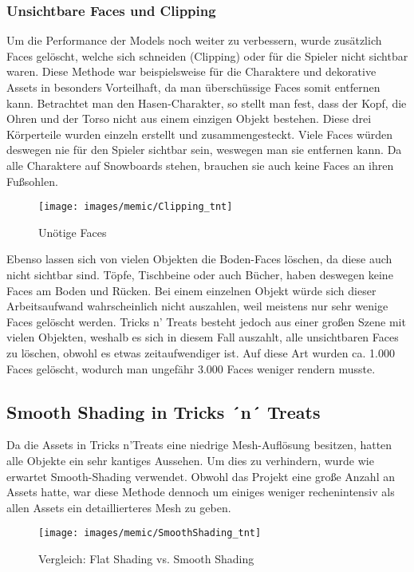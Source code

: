 \subsubsection{Unsichtbare Faces und Clipping}

Um die Performance der Models noch weiter zu verbessern, wurde zusätzlich Faces gelöscht, welche sich schneiden (Clipping) oder für die Spieler nicht sichtbar waren. Diese Methode war beispielsweise für die Charaktere und dekorative Assets in besonders Vorteilhaft, da man überschüssige Faces somit entfernen kann.
Betrachtet man den Hasen-Charakter, so stellt man fest, dass der Kopf, die Ohren und der Torso nicht aus einem einzigen Objekt bestehen. Diese drei Körperteile wurden einzeln erstellt und zusammengesteckt. Viele Faces würden deswegen nie für den Spieler sichtbar sein, weswegen man sie entfernen kann. Da alle Charaktere auf Snowboards stehen, brauchen sie auch keine Faces an ihren Fußsohlen.

\begin{figure}[H]
	\centering
	\texttt{[image: images/memic/Clipping\_tnt]}
	\caption{Unötige Faces}
\end{figure}

Ebenso lassen sich von vielen Objekten die Boden-Faces löschen, da diese auch nicht sichtbar sind. Töpfe, Tischbeine oder auch Bücher, haben deswegen keine Faces am Boden und Rücken.
Bei einem einzelnen Objekt würde sich dieser Arbeitsaufwand wahrscheinlich nicht auszahlen, weil meistens nur sehr wenige Faces gelöscht werden. Tricks n’ Treats besteht jedoch aus einer großen Szene mit vielen Objekten, weshalb es sich in diesem Fall auszahlt, alle unsichtbaren Faces zu löschen, obwohl es etwas zeitaufwendiger ist. Auf diese Art wurden ca. 1.000 Faces gelöscht, wodurch man ungefähr 3.000 Faces weniger rendern musste.

\subsection{Smooth Shading in Tricks ´n´ Treats}

Da die Assets in Tricks n’Treats eine niedrige Mesh-Auflösung besitzen, hatten alle Objekte ein sehr kantiges Aussehen. Um dies zu verhindern, wurde wie erwartet Smooth-Shading verwendet. Obwohl das Projekt eine große Anzahl an Assets hatte, war diese Methode dennoch um einiges weniger rechenintensiv als allen Assets ein detaillierteres Mesh zu geben.

\begin{figure}[H]
	\centering
	\texttt{[image: images/memic/SmoothShading\_tnt]}
	\caption{Vergleich: Flat Shading vs. Smooth Shading}
\end{figure}

